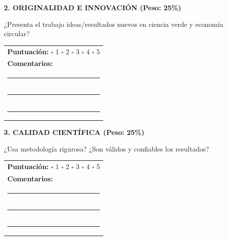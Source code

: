\documentclass[12pt,a4paper]{article}
\begin{document}
\vspace{0.6cm}

\begin{tcolorbox}[enhanced, colback=verdeclaro, colframe=verdemid, boxrule=1.5pt, left=8pt, right=8pt, top=10pt, bottom=10pt]

\noindent\textbf{2. ORIGINALIDAD E INNOVACIÓN (Peso: 25\%)}

¿Presenta el trabajo ideas/resultados nuevos en ciencia verde y economía circular?

\vspace{0.3cm}

\noindent
\begin{tabular}{p{14cm}}
\textbf{Puntuación:} \hspace{1cm}
$\square$ 1 \quad $\square$ 2 \quad $\square$ 3 \quad $\square$ 4 \quad $\square$ 5 \\[0.3cm]
\textbf{Comentarios:} \\
\rule{14cm}{0.4pt} \\
\rule{14cm}{0.4pt} \\
\rule{14cm}{0.4pt} \\
\end{tabular}

\end{tcolorbox}

\vspace{0.6cm}

\begin{tcolorbox}[enhanced, colback=verdeclaro, colframe=verdeosc, boxrule=1.5pt, left=8pt, right=8pt, top=10pt, bottom=10pt]

\noindent\textbf{3. CALIDAD CIENTÍFICA (Peso: 25\%)}

¿Usa metodología rigurosa? ¿Son válidos y confiables los resultados?

\vspace{0.3cm}

\noindent
\begin{tabular}{p{14cm}}
\textbf{Puntuación:} \hspace{1cm}
$\square$ 1 \quad $\square$ 2 \quad $\square$ 3 \quad $\square$ 4 \quad $\square$ 5 \\[0.3cm]
\textbf{Comentarios:} \\
\rule{14cm}{0.4pt} \\
\rule{14cm}{0.4pt} \\
\rule{14cm}{0.4pt} \\
\end{tabular}

\end{tcolorbox}
\end{document}
